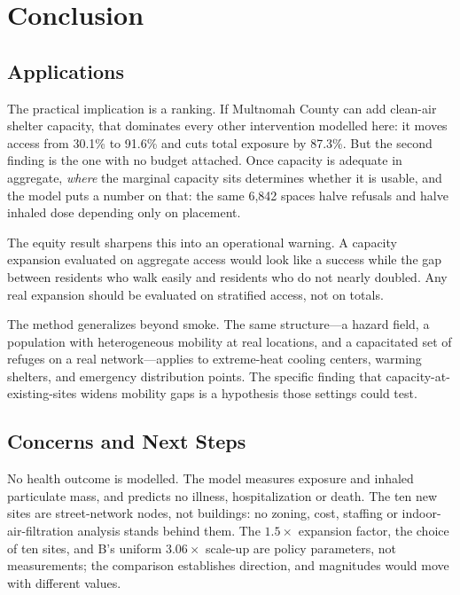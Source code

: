 \documentclass[graybox]{svmult}
\begin{document}
\section{Conclusion}
\label{sec:conclusion}

\subsection{Applications}

The practical implication is a ranking. If Multnomah County can add clean-air
shelter capacity, that dominates every other intervention modelled here: it
moves access from 30.1\% to 91.6\% and cuts total exposure by 87.3\%. But the
second finding is the one with no budget attached. Once capacity is adequate in
aggregate, \emph{where} the marginal capacity sits determines whether it is
usable, and the model puts a number on that: the same 6,842 spaces halve
refusals and halve inhaled dose depending only on placement.

The equity result sharpens this into an operational warning. A capacity
expansion evaluated on aggregate access would look like a success while the gap
between residents who walk easily and residents who do not nearly doubled. Any
real expansion should be evaluated on stratified access, not on totals.

The method generalizes beyond smoke. The same structure---a hazard field, a
population with heterogeneous mobility at real locations, and a capacitated set
of refuges on a real network---applies to extreme-heat cooling centers, warming
shelters, and emergency distribution points. The specific finding that
capacity-at-existing-sites widens mobility gaps is a hypothesis those settings
could test.

\subsection{Concerns and Next Steps}

 No health outcome is modelled. The model
measures exposure and inhaled particulate mass, and predicts no illness,
hospitalization or death. The ten new sites are street-network nodes, not
buildings: no zoning, cost, staffing or indoor-air-filtration analysis stands
behind them. The $1.5\times$ expansion factor, the choice of ten sites, and B's
uniform $3.06\times$ scale-up are policy parameters, not measurements; the
comparison establishes direction, and magnitudes would move with different
values.
\end{document}
